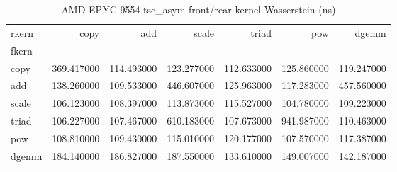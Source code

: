 \begin{table}
\caption{AMD EPYC 9554 tsc_asym front/rear kernel Wasserstein (ns)}
\begin{tabular}{lrrrrrr}
\toprule
rkern & copy & add & scale & triad & pow & dgemm \\
fkern &  &  &  &  &  &  \\
\midrule
copy & 369.417000 & 114.493000 & 123.277000 & 112.633000 & 125.860000 & 119.247000 \\
add & 138.260000 & 109.533000 & 446.607000 & 125.963000 & 117.283000 & 457.560000 \\
scale & 106.123000 & 108.397000 & 113.873000 & 115.527000 & 104.780000 & 109.223000 \\
triad & 106.227000 & 107.467000 & 610.183000 & 107.673000 & 941.987000 & 110.463000 \\
pow & 108.810000 & 109.430000 & 115.010000 & 120.177000 & 107.570000 & 117.387000 \\
dgemm & 184.140000 & 186.827000 & 187.550000 & 133.610000 & 149.007000 & 142.187000 \\
\bottomrule
\end{tabular}
\end{table}

